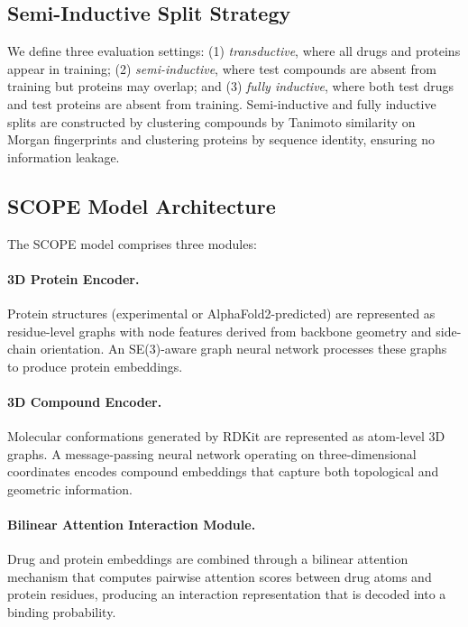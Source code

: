 \documentclass[11pt]{article}
\begin{document}
\subsection{Semi-Inductive Split Strategy}

We define three evaluation settings: (1) \textit{transductive}, where all drugs and proteins appear in training; (2) \textit{semi-inductive}, where test compounds are absent from training but proteins may overlap; and (3) \textit{fully inductive}, where both test drugs and test proteins are absent from training. Semi-inductive and fully inductive splits are constructed by clustering compounds by Tanimoto similarity on Morgan fingerprints and clustering proteins by sequence identity, ensuring no information leakage.

\subsection{SCOPE Model Architecture}

The SCOPE model comprises three modules:

\paragraph{3D Protein Encoder.} Protein structures (experimental or AlphaFold2-predicted) are represented as residue-level graphs with node features derived from backbone geometry and side-chain orientation. An SE(3)-aware graph neural network processes these graphs to produce protein embeddings.

\paragraph{3D Compound Encoder.} Molecular conformations generated by RDKit are represented as atom-level 3D graphs. A message-passing neural network operating on three-dimensional coordinates encodes compound embeddings that capture both topological and geometric information.

\paragraph{Bilinear Attention Interaction Module.} Drug and protein embeddings are combined through a bilinear attention mechanism that computes pairwise attention scores between drug atoms and protein residues, producing an interaction representation that is decoded into a binding probability.
\end{document}
